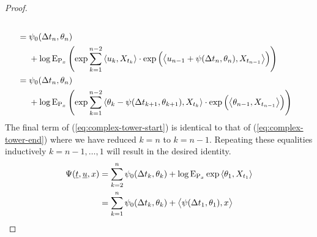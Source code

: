 \begin{proof}
\begin{align}
\begin{aligned}[t]
    \end{aligned} \\
    \notag
    &= \begin{aligned}[t]
      &\psi_0(\Delta t_n, \theta_n) \\
      &+ \log{\operatorname{E}}_{{\operatorname{P}}_x}\left( \exp\sum_{k=1}^{n-2} {\langle u_k , X_{t_k} \rangle} \cdot \exp\Big( {\big\langle u_{n-1} + \psi(\Delta t_n, \theta_n) , X_{t_{n-1}} \big\rangle} \Big)   \right) 
    \end{aligned} \\
    \label{eq:complex-tower-end}
    &= \begin{aligned}[t]
      &\psi_0(\Delta t_n, \theta_n) \\
      &+ \log{\operatorname{E}}_{{\operatorname{P}}_x}\left( \exp\sum_{k=1}^{n-2} {\langle \theta_k - \psi(\Delta t_{k+1}, \theta_{k+1}) , X_{t_k} \rangle} \cdot \exp\Big( {\big\langle \theta_{n-1} , X_{t_{n-1}} \big\rangle} \Big)   \right) 
    \end{aligned}
  \end{align}
  The final term of (\ref{eq:complex-tower-start}) is identical to that of (\ref{eq:complex-tower-end}) where we have reduced $k = n$ to $k = n-1$.
  Repeating these equalities inductively $k = n -1, \ldots, 1$ will result in the desired identity.
  \begin{align*}
    \Psi(\underline t, \underline{u}, x) 
    &= \sum_{k=2}^n \psi_0(\Delta t_k, \theta_k) + \log{\operatorname{E}}_{{\operatorname{P}}_x}\exp{\langle \theta_1 , X_{t_1} \rangle} \\
    &= \sum_{k=1}^n \psi_0(\Delta t_k, \theta_k) + {\big\langle \psi(\Delta t_1, \theta_1) , x \big\rangle}
  \end{align*}
\end{proof}
